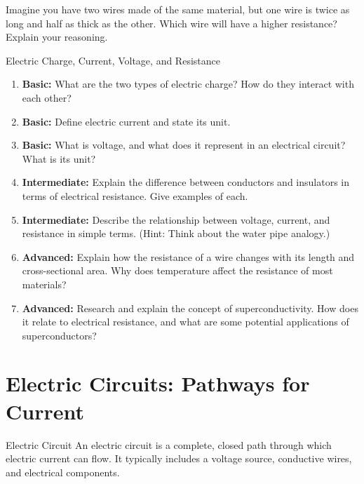 \begin{stopandthink}
Imagine you have two wires made of the same material, but one wire is twice as long and half as thick as the other. Which wire will have a higher resistance? Explain your reasoning.
\end{stopandthink}

\begin{tieredquestions}{Electric Charge, Current, Voltage, and Resistance}

\begin{enumerate}
    \item \textbf{Basic:} What are the two types of electric charge? How do they interact with each other?
    \item \textbf{Basic:} Define electric current and state its unit.
    \item \textbf{Basic:} What is voltage, and what does it represent in an electrical circuit? What is its unit?
    \item \textbf{Intermediate:} Explain the difference between conductors and insulators in terms of electrical resistance. Give examples of each.
    \item \textbf{Intermediate:}  Describe the relationship between voltage, current, and resistance in simple terms. (Hint: Think about the water pipe analogy.)
    \item \textbf{Advanced:} Explain how the resistance of a wire changes with its length and cross-sectional area. Why does temperature affect the resistance of most materials?
    \item \textbf{Advanced:}  Research and explain the concept of superconductivity. How does it relate to electrical resistance, and what are some potential applications of superconductors? 
\end{enumerate}

\end{tieredquestions}

\section{Electric Circuits: Pathways for Current}

\begin{keyconcept}{Electric Circuit}
An electric circuit is a complete, closed path through which electric current can flow.  It typically includes a voltage source, conductive wires, and electrical components.
\end{keyconcept}

